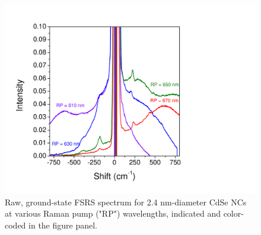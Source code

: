 \begin{figure}
\begin{center}
\includegraphics[width=\textwidth]{./appendixB/fsrssup1.pdf}
\caption[Ground state FSRS spectrum of CdSe NCs at a variety of pump wavelengths.]{Raw, ground-state FSRS spectrum for 2.4 nm-diameter CdSe NCs at various Raman pump ("RP") wavelengths, indicated and color-coded in the figure panel.}
\label{f:fsrssup1}
\end{center}
\end{figure}

